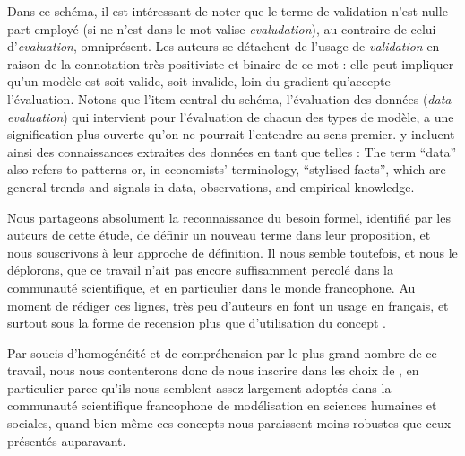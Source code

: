 Dans ce schéma, il est intéressant de noter que le terme de \og validation\fg{} n'est nulle part employé (si ne n'est dans le mot-valise \textit{evaludation}), au contraire de celui d'\og \textit{evaluation}\fg{}, omniprésent.
Les auteurs se détachent de l'usage de \og \textit{validation}\fg{} en raison de la connotation très positiviste et \og binaire\fg{} de ce mot : elle peut impliquer qu'un modèle est soit valide, soit invalide, loin du gradient qu'accepte l'évaluation.
Notons que l'item central du schéma, l'évaluation des données (\textit{data evaluation}) qui intervient pour l'évaluation de chacun des types de modèle, a une signification plus ouverte qu'on ne pourrait l'entendre au sens premier.
\textcite[121]{augusiak_merging_2014} y incluent ainsi des connaissances extraites des données en tant que telles
: \og The term ``data'' also refers
to patterns \autocite{grimm_pattern-oriented_2012} or, in economists' terminology, ``stylised facts'', which are general trends and signals in data,
observations, and empirical knowledge.\fg{}

Nous partageons absolument la reconnaissance du besoin formel, identifié par les auteurs de cette étude, de définir un nouveau terme dans leur proposition, et nous souscrivons à leur approche de définition.
Il nous semble toutefois, et nous le déplorons, que ce travail n'ait pas encore suffisamment percolé dans la communauté scientifique, et en particulier dans le monde francophone.
Au moment de rédiger ces lignes, très peu d'auteurs en font un usage en français, et surtout sous la forme de recension plus que d'utilisation du concept \autocite[par exemple][89,436]{rey-coyrehourcq_plateforme_2015}.

Par soucis d'homogénéité et de compréhension par le plus grand nombre de ce travail, nous nous contenterons donc de nous inscrire dans les choix de \textcite[voir \cref{enc:lexique-eval-amblard}]{amblard_evaluation_2006}, en particulier parce qu'ils nous semblent assez largement adoptés dans la communauté scientifique francophone de modélisation en sciences humaines et sociales, quand bien même ces concepts nous paraissent moins robustes que ceux présentés auparavant.


